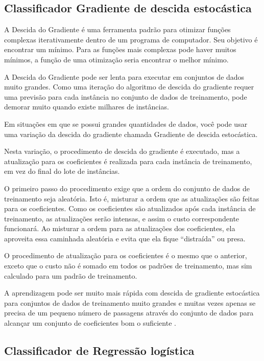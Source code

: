 \subsection{{Classificador Gradiente de descida estocástica}}

A Descida do Gradiente é uma ferramenta padrão para otimizar funções complexas iterativamente dentro de um programa de computador. Seu objetivo é encontrar um mínimo. Para as funções mais complexas pode haver muitos mínimos, a função de uma otimização seria encontrar o melhor mínimo. 

A Descida do Gradiente pode ser lenta para executar em conjuntos de dados muito grandes. Como uma iteração do algoritmo de descida do gradiente requer uma previsão para cada instância no conjunto de dados de treinamento, pode demorar muito quando existe milhares de instâncias.

Em situações em que se possui grandes quantidades de dados, você pode usar uma variação da descida do gradiente chamada Gradiente de descida estocástica.

Nesta variação, o procedimento de descida do gradiente é executado, mas a atualização para os coeficientes é realizada para cada instância de treinamento, em vez do final do lote de instâncias.

O primeiro passo do procedimento exige que a ordem do conjunto de dados de treinamento seja aleatória. Isto é, misturar a ordem que as atualizações são feitas para os coeficientes. Como os coeficientes são atualizados após cada instância de treinamento, as atualizações serão intensas, e assim o custo correspondente funcionará. Ao misturar a ordem para as atualizações dos coeficientes, ela aproveita essa caminhada aleatória e evita que ela fique “distraída” ou presa.

O procedimento de atualização para os coeficientes é o mesmo que o anterior, exceto que o custo não é somado em todos os padrões de treinamento, mas sim calculado para um padrão de treinamento.

A aprendizagem pode ser muito mais rápida com descida de gradiente estocástica para conjuntos de dados de treinamento muito grandes e muitas vezes apenas se precisa de um pequeno número de passagens através do conjunto de dados para alcançar um conjunto de coeficientes bom o suficiente \cite{gradiente}.



\subsection{{Classificador de Regressão logística}}

